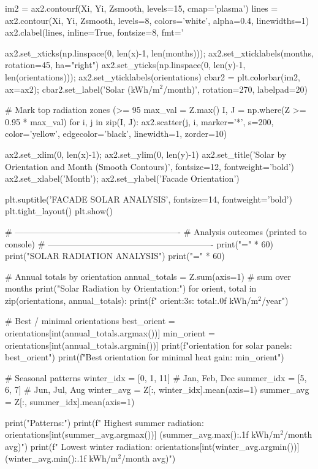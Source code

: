 {    im2 = ax2.contourf(Xi, Yi, Zsmooth, levels=15, cmap='plasma')
    lines = ax2.contour(Xi, Yi, Zsmooth, levels=8, colors='white', alpha=0.4, linewidths=1)
    ax2.clabel(lines, inline=True, fontsize=8, fmt='%

    ax2.set_xticks(np.linspace(0, len(x)-1, len(months))); ax2.set_xticklabels(months, rotation=45, ha="right")
    ax2.set_yticks(np.linspace(0, len(y)-1, len(orientations))); ax2.set_yticklabels(orientations)
    cbar2 = plt.colorbar(im2, ax=ax2); cbar2.set_label('Solar (kWh/m$^2$/month)', rotation=270, labelpad=20)

    # Mark top radiation zones (>= 95%
    max_val = Z.max()
    I, J = np.where(Z >= 0.95 * max_val)
    for i, j in zip(I, J):
        ax2.scatter(j, i, marker='*', s=200, color='yellow',
                    edgecolor='black', linewidth=1, zorder=10)

    ax2.set_xlim(0, len(x)-1); ax2.set_ylim(0, len(y)-1)
    ax2.set_title('Solar by Orientation and Month (Smooth Contours)', fontsize=12, fontweight='bold')
    ax2.set_xlabel('Month'); ax2.set_ylabel('Facade Orientation')

    plt.suptitle('FACADE SOLAR ANALYSIS', fontsize=14, fontweight='bold')
    plt.tight_layout()
    plt.show()

    # ----------------------------------------------------------
    # Analysis outcomes (printed to console)
    # ----------------------------------------------------------
    print("=" * 60)
    print("SOLAR RADIATION ANALYSIS")
    print("=" * 60)

    # Annual totals by orientation
    annual_totals = Z.sum(axis=1)  # sum over months
    print("\nAnnual Solar Radiation by Orientation:")
    for orient, total in zip(orientations, annual_totals):
        print(f"  {orient:3s}: {total:.0f} kWh/m$^2$/year")

    # Best / minimal orientations
    best_orient = orientations[int(annual_totals.argmax())]
    min_orient  = orientations[int(annual_totals.argmin())]
    print(f"\nBest orientation for solar panels: {best_orient}")
    print(f"Best orientation for minimal heat gain: {min_orient}")

    # Seasonal patterns
    winter_idx = [0, 1, 11]  # Jan, Feb, Dec
    summer_idx = [5, 6, 7]   # Jun, Jul, Aug
    winter_avg = Z[:, winter_idx].mean(axis=1)
    summer_avg = Z[:, summer_idx].mean(axis=1)

    print("\nSeasonal Patterns:")
    print(f"  Highest summer radiation: {orientations[int(summer_avg.argmax())]} ({summer_avg.max():.1f} kWh/m$^2$/month avg)")
    print(f"  Lowest winter  radiation: {orientations[int(winter_avg.argmin())]} ({winter_avg.min():.1f} kWh/m$^2$/month avg)")

}
